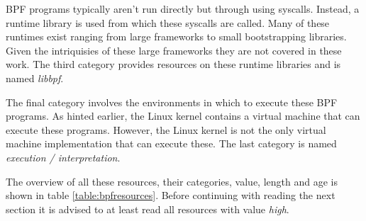 \documentclass[conference]{IEEEtran}
\begin{document}
BPF programs typically aren't run directly but through using syscalls.
Instead, a runtime library is used from which these syscalls are called.
Many of these runtimes exist ranging from large frameworks to small
bootstrapping libraries. Given the intriquisies of these large frameworks they
are not covered in these work. The third category provides resources on these
runtime libraries and is named \textit{libbpf}.

The final category involves the environments in which to execute these BPF
programs. As hinted earlier, the Linux kernel contains a virtual machine that
can execute these programs. However, the Linux kernel is not the only virtual
machine implementation that can execute these. The last category is named
\textit{execution / interpretation}.

The overview of all these resources, their categories, value, length and age
is shown in table \ref{table:bpfresources}. Before continuing with reading the
next section it is advised to at least read all resources with value
\textit{high}.
\end{document}
